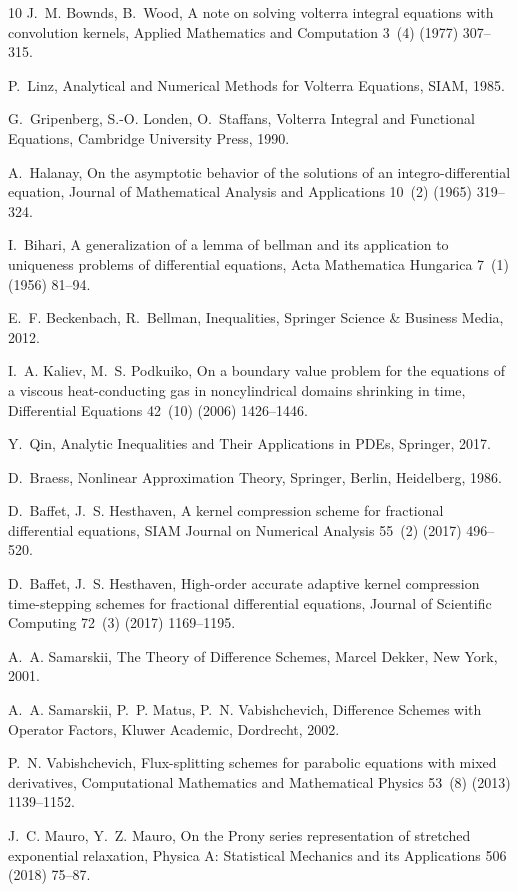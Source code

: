 \documentclass[3p]{elsarticle}
\numberwithin{equation}{section}
\begin{document}
\begin{thebibliography}{10}
J.~M. Bownds, B.~Wood, A note on solving volterra integral equations with
  convolution kernels, Applied Mathematics and Computation 3~(4) (1977)
  307--315.

P.~Linz, Analytical and Numerical Methods for Volterra Equations, SIAM, 1985.

G.~Gripenberg, S.-O. Londen, O.~Staffans, Volterra Integral and Functional
  Equations, Cambridge University Press, 1990.

A.~Halanay, On the asymptotic behavior of the solutions of an
  integro-differential equation, Journal of Mathematical Analysis and
  Applications 10~(2) (1965) 319--324.

I.~Bihari, A generalization of a lemma of bellman and its application to
  uniqueness problems of differential equations, Acta Mathematica Hungarica
  7~(1) (1956) 81--94.

E.~F. Beckenbach, R.~Bellman, Inequalities, Springer Science \& Business Media,
  2012.

I.~A. Kaliev, M.~S. Podkuiko, On a boundary value problem for the equations of
  a viscous heat-conducting gas in noncylindrical domains shrinking in time,
  Differential Equations 42~(10) (2006) 1426--1446.

Y.~Qin, Analytic Inequalities and Their Applications in PDEs, Springer, 2017.

D.~Braess, Nonlinear Approximation Theory, Springer, Berlin, Heidelberg, 1986.

D.~Baffet, J.~S. Hesthaven, A kernel compression scheme for fractional
  differential equations, SIAM Journal on Numerical Analysis 55~(2) (2017)
  496--520.

D.~Baffet, J.~S. Hesthaven, High-order accurate adaptive kernel compression
  time-stepping schemes for fractional differential equations, Journal of
  Scientific Computing 72~(3) (2017) 1169--1195.

A.~A. Samarskii, The Theory of Difference Schemes, Marcel Dekker, New York,
  2001.

A.~A. Samarskii, P.~P. Matus, P.~N. Vabishchevich, Difference Schemes with
  Operator Factors, Kluwer Academic, Dordrecht, 2002.

P.~N. Vabishchevich, Flux-splitting schemes for parabolic equations with mixed
  derivatives, Computational Mathematics and Mathematical Physics 53~(8) (2013)
  1139--1152.

J.~C. Mauro, Y.~Z. Mauro, On the {P}rony series representation of stretched
  exponential relaxation, Physica A: Statistical Mechanics and its Applications
  506 (2018) 75--87.

\end{thebibliography}
\end{document}
